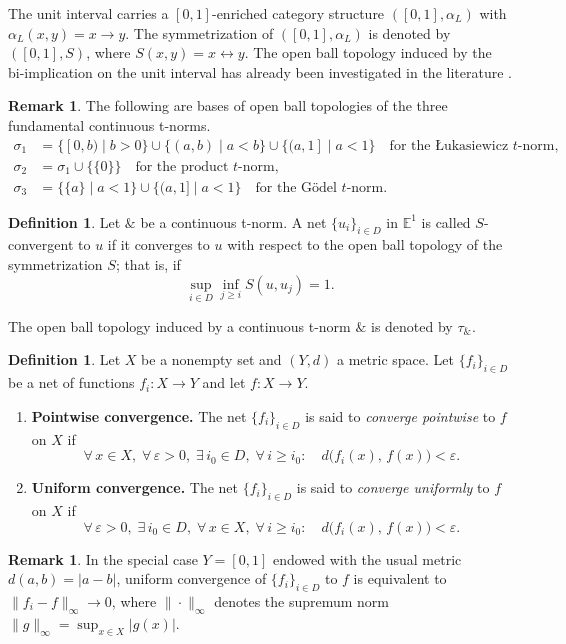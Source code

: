 \documentclass[preprint,3p,times]{elsarticle}
\theoremstyle{plain}
\theoremstyle{definition}
\newtheorem{definition}[thm]{Definition}
\newtheorem{remark}[thm]{Remark}
\numberwithin{equation}{section}
\begin{document}
The unit interval carries a $[0,1]$-enriched category structure $([0,1],\alpha_L)$ with $\alpha_L(x,y)=x\to y$.  The symmetrization of \(([0,1], \alpha_L)\) is  denoted by \(([0,1], S)\), where \(S(x,y)=x\leftrightarrow y\). The open ball topology induced by the bi-implication on the unit interval has already been investigated in the literature \cite{M. Krupka2025, Zhang2010}. 
\begin{remark}
    The following are bases of open ball topologies of the three fundamental continuous t-norms.
\begin{align*}
 \sigma_1 &= \{[0,b) \mid b>0\} \cup \{(a,b) \mid a<b\} \cup \{(a,1] \mid a<1\} \quad \text{for the {\L}ukasiewicz $t$-norm}, \\
\sigma_2 &= \sigma_1 \cup \{\{0\}\} \quad \text{for the product $t$-norm}, \\
\sigma_3 &= \{\{a\} \mid a<1\} \cup \{(a,1] \mid a<1\} \quad \text{for the G\"odel $t$-norm}.
\end{align*}
\end{remark}
\begin{definition}
   Let $\&$ be a continuous t-norm. A net $\{u_i\}_{i\in D}$ in $\mathbb{E}^1$ is called $S$-convergent to $u$ if it converges to $u$ with respect to the open ball topology of the symmetrization $S$; that is, if
\[
\sup_{i\in D}\inf_{j\ge i} S(u,u_j)=1.
\]

The open ball topology induced by a continuous t-norm \(\&\) is denoted by \(\tau_{\&}\).
\end{definition}
\begin{definition}
\label{def:convergence}
Let $X$ be a nonempty set and $(Y,d)$ a metric space. 
Let $\{f_i\}_{i\in D}$ be a net of functions $f_i:X\to Y$ and let $f:X\to Y$.
\begin{enumerate}[label=(\roman*)]
    \item \textbf{Pointwise convergence.} 
    The net $\{f_i\}_{i\in D}$ is said to \emph{converge pointwise} to $f$ on $X$ if
    \[
    \forall\,x\in X,\;\forall\,\varepsilon>0,\;\exists\,i_0\in D,
    \;\forall\,i\geq i_0:\quad d\bigl(f_i(x),\,f(x)\bigr)<\varepsilon.
    \]
    \item \textbf{Uniform convergence.}
    The net $\{f_i\}_{i\in D}$ is said to \emph{converge uniformly} to $f$ on $X$ if
    \[
    \forall\,\varepsilon>0,\;\exists\,i_0\in D,\;
    \forall\,x\in X,\;\forall\,i\geq i_0:\quad d\bigl(f_i(x),\,f(x)\bigr)<\varepsilon.
    \]
\end{enumerate}
\end{definition}
\begin{remark}\label{rmk:first-countable}
In the special case $Y=[0,1]$ endowed with the usual metric $d(a,b)=|a-b|$, 
uniform convergence of $\{f_i\}_{i\in D}$ to $f$ is equivalent to 
$\|f_i-f\|_{\infty}\to 0$, where $\|\cdot\|_{\infty}$ denotes the supremum norm
$\|g\|_{\infty}=\sup_{x\in X}|g(x)|$.
\end{remark}
\end{document}
